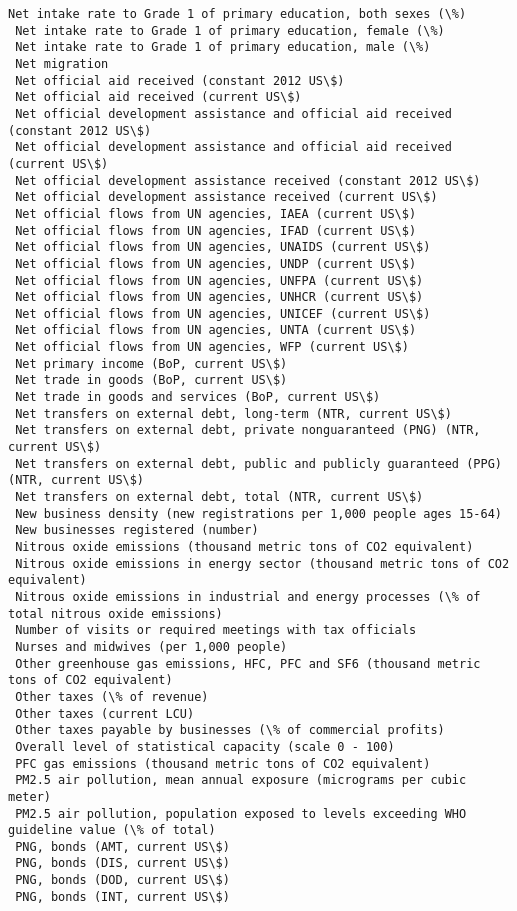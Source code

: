 \documentclass[11pt]{article}
\begin{document}
\begin{Verbatim}[commandchars=\\\{\}]
 Net intake rate to Grade 1 of primary education, both sexes (\%)
 Net intake rate to Grade 1 of primary education, female (\%)
 Net intake rate to Grade 1 of primary education, male (\%)
 Net migration
 Net official aid received (constant 2012 US\$)
 Net official aid received (current US\$)
 Net official development assistance and official aid received (constant 2012 US\$)
 Net official development assistance and official aid received (current US\$)
 Net official development assistance received (constant 2012 US\$)
 Net official development assistance received (current US\$)
 Net official flows from UN agencies, IAEA (current US\$)
 Net official flows from UN agencies, IFAD (current US\$)
 Net official flows from UN agencies, UNAIDS (current US\$)
 Net official flows from UN agencies, UNDP (current US\$)
 Net official flows from UN agencies, UNFPA (current US\$)
 Net official flows from UN agencies, UNHCR (current US\$)
 Net official flows from UN agencies, UNICEF (current US\$)
 Net official flows from UN agencies, UNTA (current US\$)
 Net official flows from UN agencies, WFP (current US\$)
 Net primary income (BoP, current US\$)
 Net trade in goods (BoP, current US\$)
 Net trade in goods and services (BoP, current US\$)
 Net transfers on external debt, long-term (NTR, current US\$)
 Net transfers on external debt, private nonguaranteed (PNG) (NTR, current US\$)
 Net transfers on external debt, public and publicly guaranteed (PPG) (NTR, current US\$)
 Net transfers on external debt, total (NTR, current US\$)
 New business density (new registrations per 1,000 people ages 15-64)
 New businesses registered (number)
 Nitrous oxide emissions (thousand metric tons of CO2 equivalent)
 Nitrous oxide emissions in energy sector (thousand metric tons of CO2 equivalent)
 Nitrous oxide emissions in industrial and energy processes (\% of total nitrous oxide emissions)
 Number of visits or required meetings with tax officials
 Nurses and midwives (per 1,000 people)
 Other greenhouse gas emissions, HFC, PFC and SF6 (thousand metric tons of CO2 equivalent)
 Other taxes (\% of revenue)
 Other taxes (current LCU)
 Other taxes payable by businesses (\% of commercial profits)
 Overall level of statistical capacity (scale 0 - 100)
 PFC gas emissions (thousand metric tons of CO2 equivalent)
 PM2.5 air pollution, mean annual exposure (micrograms per cubic meter)
 PM2.5 air pollution, population exposed to levels exceeding WHO guideline value (\% of total)
 PNG, bonds (AMT, current US\$)
 PNG, bonds (DIS, current US\$)
 PNG, bonds (DOD, current US\$)
 PNG, bonds (INT, current US\$)

\end{Verbatim}
\end{document}
